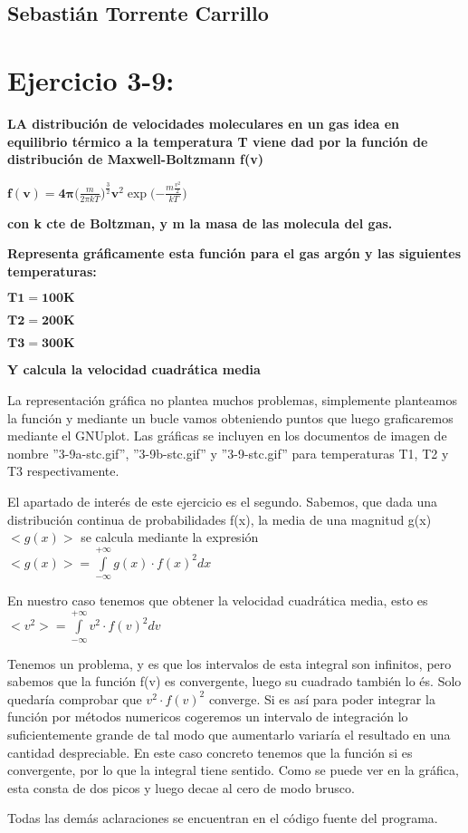 \documentclass[12pt,thmsa]{article}
\begin{document}
\subsection{\protect\vspace{1pt}Sebasti\'{a}n Torrente Carrillo}

\section{\textbf{Ejercicio 3-9:}}

\textbf{LA distribuci\'{o}n de velocidades moleculares en un gas idea en
equilibrio t\'{e}rmico a la temperatura T viene dad por la funci\'{o}n de
distribuci\'{o}n de Maxwell-Boltzmann f(v)}

$\mathbf{f(v)=4\pi (}\frac{m}{2\pi kT}\mathbf{)}^{\frac{3}{2}}\mathbf{v}%
^{2}\exp \mathbf{(-}\frac{m\frac{v^{2}}{2}}{kT}\mathbf{)}$

\textbf{con k cte de Boltzman, y m la masa de las molecula del gas.}

\textbf{Representa gr\'{a}ficamente esta funci\'{o}n para el gas arg\'{o}n y
las siguientes temperaturas:}

$\mathbf{T1=100K}$

$\mathbf{T2=200K}$

$\mathbf{T3=300K}$

\textbf{Y calcula la velocidad cuadr\'{a}tica media}

\textbf{\vspace{1pt}}

La representaci\'{o}n gr\'{a}fica no plantea muchos problemas, simplemente
planteamos la funci\'{o}n y mediante un bucle vamos obteniendo puntos que
luego graficaremos mediante el GNUplot. Las gr\'{a}ficas se incluyen en los
documentos de imagen de nombre ''3-9a-stc.gif'', ''3-9b-stc.gif'' y
''3-9-stc.gif'' para temperaturas T1, T2 y T3 respectivamente.

\vspace{1pt}

El apartado de inter\'{e}s de este ejercicio es el segundo. Sabemos, que
dada una distribuci\'{o}n continua de probabilidades f(x), la media de una
magnitud g(x) $<g(x)>$ se calcula mediante la expresi\'{o}n $%
<g(x)>=\int\limits_{-\infty }^{+\infty }g(x)\cdot f(x)^{2}dx$

En nuestro caso tenemos que obtener la velocidad cuadr\'{a}tica media, esto
es $<v^{2}>=\int\limits_{-\infty }^{+\infty }v^{2}\cdot f(v)^{2}dv$

Tenemos un problema, y es que los intervalos de esta integral son infinitos,
pero sabemos que la funci\'{o}n f(v) es convergente, luego su cuadrado
tambi\'{e}n lo \'{e}s. Solo quedar\'{i}a comprobar que $v^{2}\cdot f(v)^{2}$
converge. Si es as\'{i} para poder integrar la funci\'{o}n por m\'{e}todos
numericos cogeremos un intervalo de integraci\'{o}n lo suficientemente
grande de tal modo que aumentarlo variar\'{i}a el resultado en una cantidad
despreciable. En este caso concreto tenemos que la funci\'{o}n si es
convergente, por lo que la integral tiene sentido. Como se puede ver en la
gr\'{a}fica, esta consta de dos picos y luego decae al cero de modo brusco.

\vspace{1pt}

Todas las dem\'{a}s aclaraciones se encuentran en el c\'{o}digo fuente del
programa.
\end{document}
